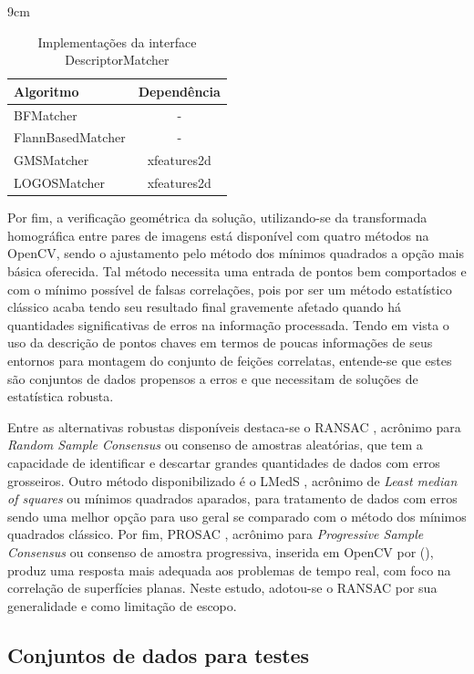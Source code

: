 \begin{table}[!ht]{9cm}
  \caption{Implementações da interface DescriptorMatcher}\label{BFMTabela}
  \hfill
  \begin{tabular}{l|c}
    \hline
      Algoritmo & Dependência \\
    \hline
      BFMatcher & -\\
      FlannBasedMatcher & -\\
      GMSMatcher & xfeatures2d\\
      LOGOSMatcher & xfeatures2d\\
    \hline
  \end{tabular}
  \hfill
\end{table}

Por fim, a verificação geométrica da solução, utilizando-se da transformada homográfica entre pares de imagens está disponível com quatro métodos na OpenCV, sendo o ajustamento pelo método dos mínimos quadrados a opção mais básica oferecida. Tal método necessita uma entrada de pontos bem comportados e com o mínimo possível de falsas correlações, pois por ser um método estatístico clássico acaba tendo seu resultado final gravemente afetado quando há quantidades significativas de erros na informação processada. Tendo em vista o uso da descrição de pontos chaves em termos de poucas informações de seus entornos para montagem do conjunto de feições correlatas, entende-se que estes são conjuntos de dados propensos a erros e que necessitam de soluções de estatística robusta.

Entre as alternativas robustas disponíveis destaca-se o RANSAC \cite{RANSAC}, acrônimo para \textit{Random Sample Consensus} ou  consenso de amostras aleatórias, que tem a capacidade de identificar e descartar grandes quantidades de dados com erros grosseiros. Outro método disponibilizado é o LMedS \cite{LMEDS}, acrônimo de \textit{Least median of squares} ou mínimos quadrados aparados, para tratamento de dados com erros sendo uma melhor opção para uso geral se comparado com o método dos mínimos quadrados clássico. Por fim, PROSAC \cite{PROSAC},  acrônimo para \textit{Progressive Sample Consensus} ou consenso de amostra progressiva, inserida em OpenCV por  (\citeyear{RHO}), produz uma resposta mais adequada aos problemas de tempo real, com foco na correlação de superfícies planas. Neste estudo, adotou-se o RANSAC por sua generalidade e como limitação de escopo. 

\subsection{Conjuntos de dados para testes}\label{conjdados}

